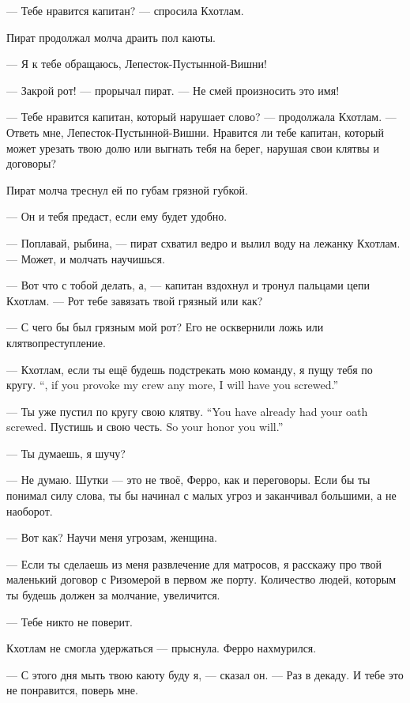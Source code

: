 --- Тебе нравится капитан? --- спросила Кхотлам.

Пират продолжал молча драить пол каюты.

--- Я к тебе обращаюсь, Лепесток-Пустынной-Вишни!

--- Закрой рот! --- прорычал пират.
--- Не смей произносить это имя!

--- Тебе нравится капитан, который нарушает слово? --- продолжала Кхотлам.
--- Ответь мне, Лепесток-Пустынной-Вишни.
Нравится ли тебе капитан, который может урезать твою долю или выгнать тебя на берег, нарушая свои клятвы и договоры?

Пират молча треснул ей по губам грязной губкой.

--- Он и тебя предаст, если ему будет удобно.

--- Поплавай, рыбина, --- пират схватил ведро и вылил воду на лежанку Кхотлам.
--- Может, и молчать научишься.

\asterism

--- Вот что с тобой делать, а, --- капитан вздохнул и тронул пальцами цепи Кхотлам.
--- Рот тебе завязать твой грязный или как?

--- С чего бы был грязным мой рот?
Его не осквернили ложь или клятвопреступление.

{--- Кхотлам, если ты ещё будешь подстрекать мою команду, я пущу тебя по кругу.}
{``\Kchotlam, if you provoke my crew any more, I will have you screwed.''}

{--- Ты уже пустил по кругу свою клятву.}
{``You have already had your oath screwed.}
{Пустишь и свою честь.}
{So your honor you will.''}

--- Ты думаешь, я шучу?

--- Не думаю.
Шутки --- это не твоё, Ферро, как и переговоры.
Если бы ты понимал силу слова, ты бы начинал с малых угроз и заканчивал большими, а не наоборот.

--- Вот как?
Научи меня угрозам, женщина.

--- Если ты сделаешь из меня развлечение для матросов, я расскажу про твой маленький договор с Ризомерой в первом же порту.
Количество людей, которым ты будешь должен за молчание, увеличится.

--- Тебе никто не поверит.

Кхотлам не смогла удержаться --- прыснула.
Ферро нахмурился.

--- С этого дня мыть твою каюту буду я, --- сказал он.
--- Раз в декаду.
И тебе это не понравится, поверь мне.

